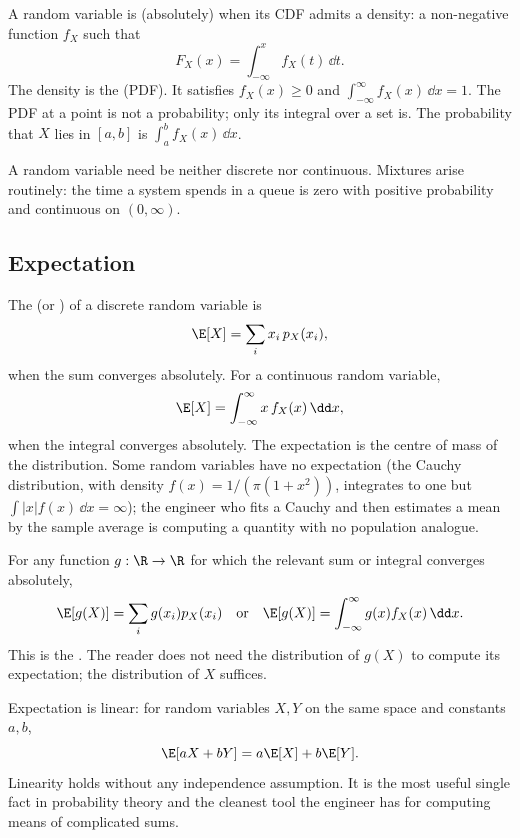 A random variable is (absolutely)  when its CDF
admits a density: a non-negative function $f_{X}$ such that
\[
F_{X}(x) = \int_{-\infty}^{x} f_{X}(t) \,\dd t.
\]
The density is the  (PDF). It
satisfies $f_{X}(x) \geq 0$ and $\int_{-\infty}^{\infty} f_{X}(x)
\,\dd x = 1$. The PDF at a point is not a probability; only its
integral over a set is. The probability that $X$ lies in $[a, b]$ is
$\int_{a}^{b} f_{X}(x) \,\dd x$.

A random variable need be neither discrete nor continuous. Mixtures
arise routinely: the time a system spends in a queue is zero with
positive probability and continuous on $(0, \infty)$.

\subsection{Expectation}

The  (or ) of a discrete random
variable is
\[
\E[X] = \sum_{i} x_{i} \, p_{X}(x_{i}),
\]
when the sum converges absolutely. For a continuous random variable,
\[
\E[X] = \int_{-\infty}^{\infty} x \, f_{X}(x) \,\dd x,
\]
when the integral converges absolutely. The expectation is the
centre of mass of the distribution. Some random variables have no
expectation (the Cauchy distribution, with density
$f(x) = 1/(\pi(1 + x^{2}))$, integrates to one but $\int |x| f(x)
\,\dd x = \infty$); the engineer who fits a Cauchy and then
estimates a mean by the sample average is computing a quantity with
no population analogue.

For any function $g : \R \to \R$ for which the relevant sum or
integral converges absolutely,
\[
\E[g(X)] = \sum_{i} g(x_{i}) p_{X}(x_{i})
\quad\text{or}\quad
\E[g(X)] = \int_{-\infty}^{\infty} g(x) f_{X}(x) \,\dd x.
\]
This is the . The
reader does not need the distribution of $g(X)$ to compute its
expectation; the distribution of $X$ suffices.

Expectation is linear: for random variables $X, Y$ on the same
space and constants $a, b$,
\[
\E[aX + bY] = a\E[X] + b\E[Y].
\]
Linearity holds without any independence assumption. It is the most
useful single fact in probability theory and the cleanest tool the
engineer has for computing means of complicated sums.


